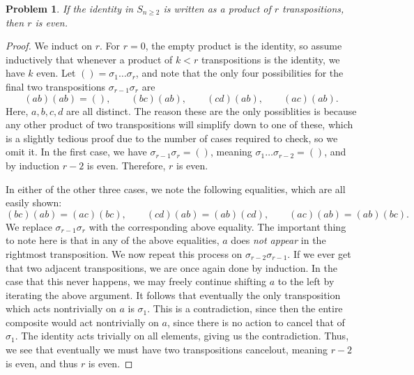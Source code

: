\documentclass[11pt, letterpaper]{article}
\theoremstyle{plain}
\newtheorem{problem}{Problem}[section]
\begin{document}
\begin{problem}\label{7.2}
	If the identity in $S_{n\geq 2} $ is written as a product of $r$ transpositions, then $r$ is even.
\end{problem}
\begin{proof}
	We induct on $r$. For $r=0$, the empty product is the identity, so assume inductively that whenever a product of $k<r$ transpositions is the identity, we have $k$ even. Let $( ) = \sigma _1 \ldots \sigma _r$, and note that the only four possibilities for the final two transpositions $\sigma_{r-1} \sigma _r$ are
	\[
		(ab)(ab)=( ),\qquad (bc)(ab),\qquad (cd)(ab),\qquad (ac)(ab)
	.\]
	Here, $a,b,c,d$ are all distinct. The reason these are the only possiblities is because any other product of two transpositions will simplify down to one of these, which is a slightly tedious proof due to the number of cases required to check, so we omit it. In the first case, we have $\sigma _{r-1} \sigma _r=( )$, meaning $\sigma _1 \ldots \sigma _{r-2} =( )$, and by induction $r-2$ is even. Therefore, $r$ is even.

	In either of the other three cases, we note the following equalities, which are all easily shown:
	\[
		(bc)(ab)=(ac)(bc),\qquad (cd)(ab)=(ab)(cd),\qquad (ac)(ab)=(ab)(bc)	
	.\]
	We replace $\sigma _{r-1} \sigma _r$ with the corresponding above equality. The important thing to note here is that in any of the above equalities, $a$ does \emph{not appear} in the rightmost transposition. We now repeat this process on $\sigma _{r-2} \sigma _{r-1} $. If we ever get that two adjacent transpositions, we are once again done by induction. In the case that this never happens, we may freely continue shifting $a$ to the left by iterating the above argument. It follows that eventually the only transposition which acts nontrivially on $a$ is $\sigma _1$. This is a contradiction, since then the entire composite would act nontrivially on $a$, since there is no action to cancel that of $\sigma _1$. The identity acts trivially on all elements, giving us the contradiction. Thus, we see that eventually we must have two transpositions cancelout, meaning $r-2$ is even, and thus $r$ is even.
\end{proof}
\end{document}
